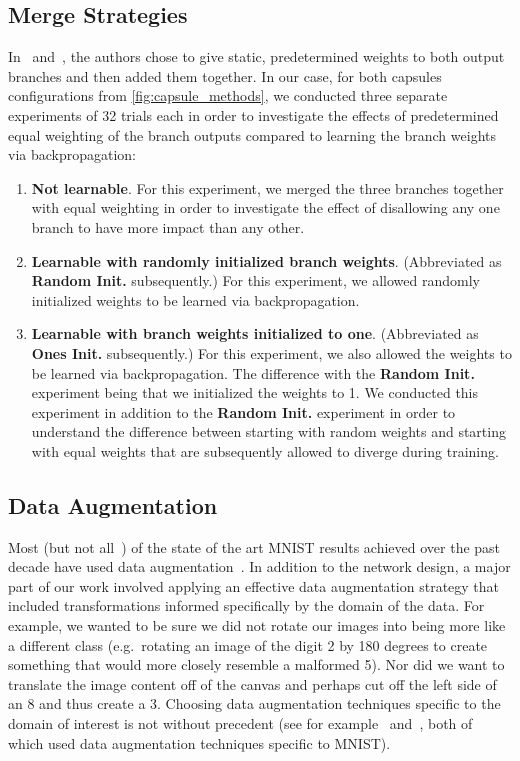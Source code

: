\documentclass{article}
\newcommand{\rightparenthesis}{)}
\begin{document}
\subsection{Merge Strategies}\label{sec:experimental_setup_merge_strategies}

In~\cite{Szegedy2015a} and~\cite{Szegedy2015b}, the authors chose to give static, predetermined weights to both output branches and then added them together.  In our case, for both capsules configurations from \autoref{fig:capsule_methods}, we conducted three separate experiments of 32 trials each in order to investigate the effects of predetermined equal weighting of the branch outputs compared to learning the branch weights via backpropagation:

\begin{enumerate}[label=\arabic*\rightparenthesis]
\item \textbf{Not learnable}.  For this experiment, we merged the three branches together with equal weighting in order to investigate the effect of disallowing any one branch to have more impact than any other.
\item \textbf{Learnable with randomly initialized branch weights}. (Abbreviated as \textbf{Random Init.} subsequently.)  For this experiment, we allowed randomly initialized weights to be learned via backpropagation.
\item \textbf{Learnable with branch weights initialized to one}.  (Abbreviated as \textbf{Ones Init.} subsequently.)  For this experiment, we also allowed the weights to be learned via backpropagation.  The difference with the \textbf{Random Init.} experiment being that we initialized the weights to 1.  We conducted this experiment in addition to the \textbf{Random Init.} experiment in order to understand the difference between starting with random weights and starting with equal weights that are subsequently allowed to diverge during training.
\end{enumerate}

\subsection{Data Augmentation}\label{sec:experimental_setup_data_augmentation}

Most (but not all~\cite{Hasanpour2016}\cite{Chang2015}) of the state of the art MNIST results achieved over the past decade have used data augmentation~\cite{Sato2015}\cite{Wan2013}\cite{Ciresan2012}.  In addition to the network design, a major part of our work involved applying an effective data augmentation strategy that included transformations informed specifically by the domain of the data.  For example, we wanted to be sure we did not rotate our images into being more like a different class (e.g.\ rotating an image of the digit 2 by 180 degrees to create something that would more closely resemble a malformed 5).  Nor did we want to translate the image content off of the canvas and perhaps cut off the left side of an 8 and thus create a 3.  Choosing data augmentation techniques specific to the domain of interest is not without precedent (see for example~\cite{Ciresan2012} and~\cite{Sabour2017}, both of which used data augmentation techniques specific to MNIST).
\end{document}
